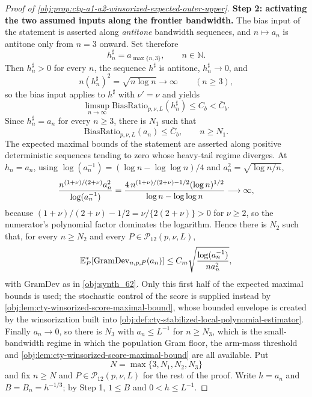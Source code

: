 \begin{proof}[Proof of \cref{obj:prop:cty-a1-a2-winsorized-expected-outer-upper}]
\textbf{Step 2: activating the two assumed inputs along the frontier bandwidth.}  The bias input of the statement is asserted along \emph{antitone} bandwidth sequences, and \(n\mapsto a_n\) is antitone only from \(n=3\) onward.  Set therefore
\[
h^\sharp_n=a_{\max\{n,3\}},
\qquad n\in\mathbb N .
\]
Then \(h^\sharp_n>0\) for every \(n\), the sequence \(h^\sharp\) is antitone, \(h^\sharp_n\to0\), and
\[
n(h^\sharp_n)^2=\sqrt{n\log n}\to\infty
\qquad(n\geq3),
\]
so the bias input applies to \(h^\sharp\) with \(\nu'=\nu\) and yields
\[
\limsup_{n\to\infty}\mathrm{BiasRatio}_{p,\nu,L}(h^\sharp_n)\leq C_b<\bar C_b .
\]
Since \(h^\sharp_n=a_n\) for every \(n\geq3\), there is \(N_1\) such that
\[
\mathrm{BiasRatio}_{p,\nu,L}(a_n)\leq\bar C_b,
\qquad n\geq N_1 .
\]
The expected maximal bounds of the statement are asserted along positive deterministic sequences tending to zero whose heavy-tail regime diverges.  At \(h_n=a_n\), using \(\log(a_n^{-1})=(\log n-\log\log n)/4\) and \(a_n^2=\sqrt{\log n/n}\),
\[
{n^{(1+\nu)/(2+\nu)}a_n^2\over\log(a_n^{-1})}
=
{4\,n^{(1+\nu)/(2+\nu)-1/2}(\log n)^{1/2}\over\log n-\log\log n}
\longrightarrow\infty,
\]
because \((1+\nu)/(2+\nu)-1/2=\nu/\{2(2+\nu)\}>0\) for \(\nu\geq2\), so the numerator's polynomial factor dominates the logarithm.  Hence there is \(N_2\) such that, for every \(n\geq N_2\) and every \(P\in\mathcal P_{12}(p,\nu,L)\),
\[
\mathbb E_P^*\!\left[\mathrm{GramDev}_{n,p,P}(a_n)\right]
\leq
C_m\sqrt{\log(a_n^{-1})\over na_n^2},
\]
with \(\mathrm{GramDev}\) as in \cref{obj:synth_62}.  Only this first half of the expected maximal bounds is used; the stochastic control of the score is supplied instead by \cref{obj:lem:cty-winsorized-score-maximal-bound}, whose bounded envelope is created by the winsorization built into \cref{obj:def:cty-stabilized-local-polynomial-estimator}.
Finally \(a_n\to0\), so there is \(N_3\) with \(a_n\leq L^{-1}\) for \(n\geq N_3\), which is the small-bandwidth regime in which the population Gram floor, the arm-mass threshold and \cref{obj:lem:cty-winsorized-score-maximal-bound} are all available.  Put
\[
N=\max\{3,N_1,N_2,N_3\}
\]
and fix \(n\geq N\) and \(P\in\mathcal P_{12}(p,\nu,L)\) for the rest of the proof.  Write \(h=a_n\) and \(B=B_n=h^{-1/3}\); by Step 1, \(1\leq B\) and \(0<h\leq L^{-1}\).


\end{proof}
